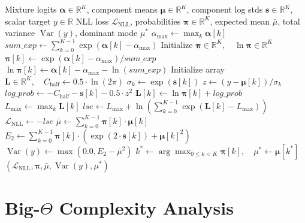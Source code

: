 \documentclass[11pt,a4paper]{article}
\theoremstyle{definition}
\begin{document}
\begin{algorithm}[H]
\caption{Mixture Density Network Forward Pass, NLL Loss, and Variance Decomposition}
\begin{algorithmic}[1]
\Require Mixture logits $\boldsymbol{\alpha} \in \mathbb{R}^K$, component means $\boldsymbol{\mu} \in \mathbb{R}^K$, component log stds $\mathbf{s} \in \mathbb{R}^K$, scalar target $y \in \mathbb{R}$
\Ensure NLL loss $\mathcal{L}_{\text{NLL}}$, probabilities $\boldsymbol{\pi} \in \mathbb{R}^K$, expected mean $\bar{\mu}$, total variance $\operatorname{Var}(y)$, dominant mode $\mu^*$
\State $\alpha_{\max} \gets \max_k \boldsymbol{\alpha}[k]$
\State $sum\_exp \gets \sum_{k=0}^{K-1} \exp(\boldsymbol{\alpha}[k] - \alpha_{\max})$
\State Initialize $\boldsymbol{\pi} \in \mathbb{R}^K, \quad \ln\boldsymbol{\pi} \in \mathbb{R}^K$
    \State $\boldsymbol{\pi}[k] \gets \exp(\boldsymbol{\alpha}[k] - \alpha_{\max}) / sum\_exp$
    \State $\ln\boldsymbol{\pi}[k] \gets \boldsymbol{\alpha}[k] - \alpha_{\max} - \ln(sum\_exp)$
\EndFor
\State Initialize array $\mathbf{L} \in \mathbb{R}^K, \quad C_{\text{half}} \gets 0.5 \cdot \ln(2\pi)$
 
    \State $\sigma_k \gets \exp(\mathbf{s}[k])$
    \State $z \gets (y - \boldsymbol{\mu}[k]) / \sigma_k$
    \State $log\_prob \gets - C_{\text{half}} - \mathbf{s}[k] - 0.5 \cdot z^2$
    \State $\mathbf{L}[k] \gets \ln\boldsymbol{\pi}[k] + log\_prob$
\EndFor
\State $L_{\max} \gets \max_k \mathbf{L}[k]$ 
\State $lse \gets L_{\max} + \ln\left( \sum_{k=0}^{K-1} \exp(\mathbf{L}[k] - L_{\max}) \right)$
\State $\mathcal{L}_{\text{NLL}} \gets - lse$
\State $\bar{\mu} \gets \sum_{k=0}^{K-1} \boldsymbol{\pi}[k] \cdot \boldsymbol{\mu}[k]$ 
\State $E_2 \gets \sum_{k=0}^{K-1} \boldsymbol{\pi}[k] \cdot \left( \exp(2 \cdot \mathbf{s}[k]) + \boldsymbol{\mu}[k]^2 \right)$
\State $\operatorname{Var}(y) \gets \max(0.0, E_2 - \bar{\mu}^2)$ 
\State $k^* \gets \arg\max_{0 \le k < K} \boldsymbol{\pi}[k], \quad \mu^* \gets \boldsymbol{\mu}[k^*]$
\State \Return $(\mathcal{L}_{\text{NLL}}, \boldsymbol{\pi}, \bar{\mu}, \operatorname{Var}(y), \mu^*)$
\end{algorithmic}
\end{algorithm}

\section{Big-$\Theta$ Complexity Analysis}
\end{document}
